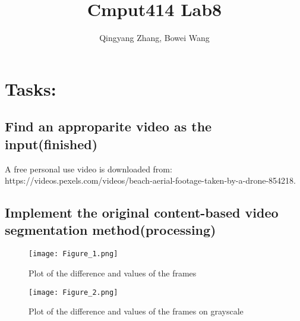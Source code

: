 \documentclass[11pt]{article} %
\title{Cmput414 Lab8}
\author{Qingyang Zhang, Bowei Wang}
\begin{document}
\maketitle

\section{Tasks:}






\subsection{Find an approparite video as the input(finished)}
A free personal use video is downloaded from:\\ https://videos.pexels.com/videos/beach-aerial-footage-taken-by-a-drone-854218.
\subsection{Implement the original content-based video segmentation method(processing)}

\begin{figure}
  \centering
  \texttt{[image: Figure\_1.png]} %
  \caption{Plot of the difference and values of the frames} %
  \label{plot} %
\end{figure}

\begin{figure}
  \centering
  \texttt{[image: Figure\_2.png]} %
  \caption{Plot of the difference and values of the frames on grayscale} %
  \label{plot_gray} %
\end{figure}
\end{document}
